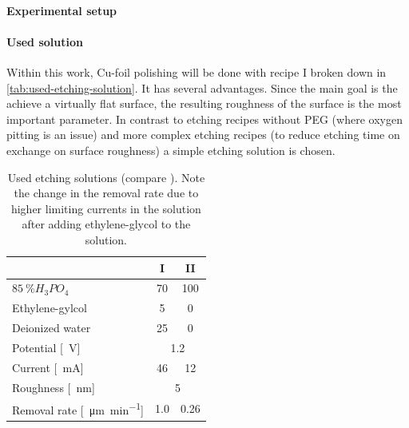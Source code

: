 


\paragraph{Experimental setup}

\paragraph{Used solution}
Within this work, Cu-foil polishing will be done with recipe I broken down in \autoref{tab:used-etching-solution}. It has several advantages. Since the main goal is the achieve a virtually flat surface, the resulting roughness of the surface is the most important parameter. In contrast to etching recipes without PEG (where oxygen pitting is an issue) and more complex etching recipes (to reduce etching time on exchange on surface roughness) a simple etching solution is chosen.

\begin{table}\centering
	\caption{Used etching solutions (compare \cite[130]{jinshan_electrochemical_2004}). Note the change in the removal rate due to higher limiting currents in the solution after adding ethylene-glycol to the solution.}
	\begin{tabular}{lcc}
		& I & II \\ \hline \hline
		$\SI{85}{\percent} H_3PO_4$ & 70 & 100 \\
		Ethylene-gylcol & 5 & 0 \\
		Deionized water & 25 & 0 \\ \hline
		Potential [\SI{}{\V}] & \multicolumn{2}{c}{\SI{1.2}{}} \\
		Current [\SI{}{\mA}] & 46 & 12\\
		Roughness [\SI{}{\nm}] & \multicolumn{2}{c}{\SI{5}{}} \\
		Removal rate [\SI{}{\micro\meter\per\minute}] & \SI{1,0}{} & \SI{0,26}{}\\
	\end{tabular}
	\label{table:used-etching-solutions}
\end{table}

